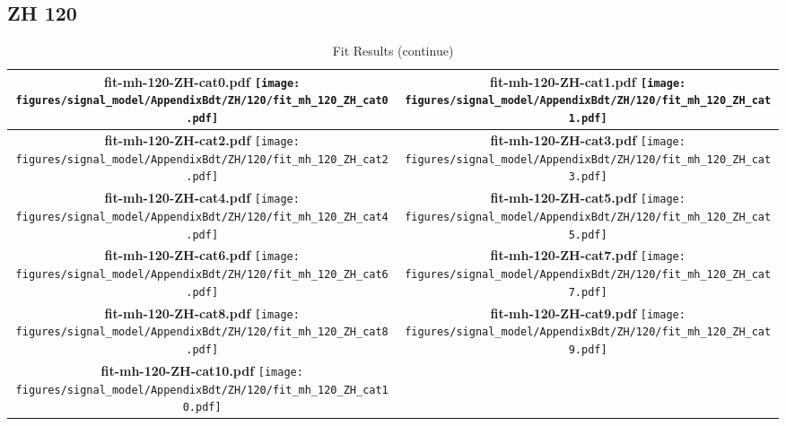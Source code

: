 \subsection{ZH 120}
\begin{longtable}{|c|c|}
\caption{Fit Results}
\endfirsthead
\caption{Fit Results (continue)}
\endhead
\hline
\parbox{0.47\textwidth}{
\centering
{\bfseries fit-mh-120-ZH-cat0.pdf}
\texttt{[image: figures/signal\_model/AppendixBdt/ZH/120/fit\_mh\_120\_ZH\_cat0.pdf]}
}
 & \parbox{0.47\textwidth}{
\centering
{\bfseries fit-mh-120-ZH-cat1.pdf}
\texttt{[image: figures/signal\_model/AppendixBdt/ZH/120/fit\_mh\_120\_ZH\_cat1.pdf]}
}
 \\
\hline
\parbox{0.47\textwidth}{
\centering
{\bfseries fit-mh-120-ZH-cat2.pdf}
\texttt{[image: figures/signal\_model/AppendixBdt/ZH/120/fit\_mh\_120\_ZH\_cat2.pdf]}
}
 & \parbox{0.47\textwidth}{
\centering
{\bfseries fit-mh-120-ZH-cat3.pdf}
\texttt{[image: figures/signal\_model/AppendixBdt/ZH/120/fit\_mh\_120\_ZH\_cat3.pdf]}
}
 \\
\hline
\parbox{0.47\textwidth}{
\centering
{\bfseries fit-mh-120-ZH-cat4.pdf}
\texttt{[image: figures/signal\_model/AppendixBdt/ZH/120/fit\_mh\_120\_ZH\_cat4.pdf]}
}
 & \parbox{0.47\textwidth}{
\centering
{\bfseries fit-mh-120-ZH-cat5.pdf}
\texttt{[image: figures/signal\_model/AppendixBdt/ZH/120/fit\_mh\_120\_ZH\_cat5.pdf]}
}
 \\
\hline
\parbox{0.47\textwidth}{
\centering
{\bfseries fit-mh-120-ZH-cat6.pdf}
\texttt{[image: figures/signal\_model/AppendixBdt/ZH/120/fit\_mh\_120\_ZH\_cat6.pdf]}
}
 & \parbox{0.47\textwidth}{
\centering
{\bfseries fit-mh-120-ZH-cat7.pdf}
\texttt{[image: figures/signal\_model/AppendixBdt/ZH/120/fit\_mh\_120\_ZH\_cat7.pdf]}
}
 \\
\hline
\parbox{0.47\textwidth}{
\centering
{\bfseries fit-mh-120-ZH-cat8.pdf}
\texttt{[image: figures/signal\_model/AppendixBdt/ZH/120/fit\_mh\_120\_ZH\_cat8.pdf]}
}
 & \parbox{0.47\textwidth}{
\centering
{\bfseries fit-mh-120-ZH-cat9.pdf}
\texttt{[image: figures/signal\_model/AppendixBdt/ZH/120/fit\_mh\_120\_ZH\_cat9.pdf]}
}
 \\
\hline
\parbox{0.47\textwidth}{
\centering
{\bfseries fit-mh-120-ZH-cat10.pdf}
\texttt{[image: figures/signal\_model/AppendixBdt/ZH/120/fit\_mh\_120\_ZH\_cat10.pdf]}
}
 & \parbox{0.47\textwidth}{
}
\end{longtable}
